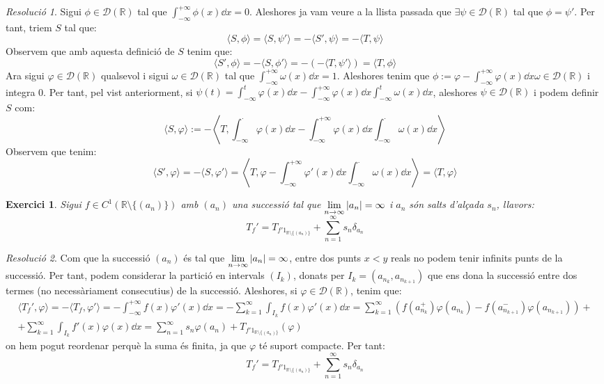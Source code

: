 \documentclass[10pt,a4paper]{article}
\newcommand{\RR}{\ensuremath{\mathbb{R}}} %
\newcommand{\vf}[1]{\boldsymbol{\mathrm{#1}}} %
\newtheorem{exercici}{Exercici}
\theoremstyle{definition}
\theoremstyle{remark}
\newtheorem*{res}{Resolució}
\begin{document}
\begin{res}
  Sigui $\phi\in\mathcal{D}(\RR)$ tal que $\int_{-\infty}^{+\infty}\phi(x) \dd{x}=0$. Aleshores ja vam veure a la llista passada que $\exists\psi\in \mathcal{D}(\RR)$ tal que $\phi=\psi'$. Per tant, triem $S$ tal que:
  $$
    \langle S,\phi\rangle = \langle S,\psi'\rangle = -\langle S',\psi\rangle = -\langle T,\psi\rangle
  $$
  Observem que amb aquesta definició de $S$ tenim que:
  $$
    \langle S',\phi\rangle = - \langle S, \phi'\rangle =-(-\langle T, \psi' \rangle) = \langle T, \phi \rangle
  $$
  Ara sigui $\varphi\in\mathcal{D}(\RR)$ qualsevol i sigui $\omega\in \mathcal{D}(\RR)$ tal que $\int_{-\infty}^{+\infty}\omega(x) \dd{x}=1$.
  Aleshores tenim que $\phi:=\varphi-\int_{-\infty}^{+\infty}\varphi(x) \dd{x}\omega\in\mathcal{D}(\RR)$ i integra 0. Per tant, pel vist anteriorment, si $\psi(t)=\int_{-\infty}^{t}\varphi(x)\dd{x}-\int_{-\infty}^{+\infty} \varphi(x)\dd{x}\int_{-\infty}^{t}\omega(x)\dd{x}$, aleshores $\psi\in\mathcal{D}(\RR)$ i podem definir $S$ com:
  $$
    \langle S,\varphi \rangle := -\left\langle T, \int_{-\infty}^{\cdot}\varphi(x)\dd{x}-\int_{-\infty}^{+\infty} \varphi(x)\dd{x}\int_{-\infty}^{\cdot}\omega(x)\dd{x} \right\rangle
  $$
  Observem que tenim:
  $$
    \langle S',\varphi \rangle = -\langle S,\varphi' \rangle = \left\langle T,\varphi-\int_{-\infty}^{+\infty} \varphi'(x)\dd{x}\int_{-\infty}^{\cdot}\omega(x)\dd{x} \right\rangle= \langle T,\varphi \rangle
  $$
\end{res}
\begin{exercici}
  Sigui $f\in C^1(\RR\setminus\{(a_n)\})$ amb $(a_n)$ una successió tal que $\displaystyle \lim_{n\to\infty}\abs{a_n}=\infty$ i $a_n$ són salts d'alçada $s_n$, llavors:
  $$
    T_f'=T_{f'\vf{1}_{\RR\setminus\{(a_n)\}}}+\sum_{n=1}^\infty s_n\delta_{a_n}
  $$
\end{exercici}
\begin{res}
  Com que la successió $(a_n)$ és tal que $\displaystyle \lim_{n\to\infty}\abs{a_n}=\infty$, entre dos punts $x<y$ reals no podem tenir infinits punts de la successió. Per tant, podem considerar la partició en intervals $(I_k)$, donats per $I_k=(a_{n_k},a_{n_{k+1}})$ que ens dona la successió entre dos termes (no necessàriament consecutius) de la successió. Aleshores, si $\varphi\in\mathcal{D}(\RR)$, tenim que:
  \begin{multline*}
    \langle T_f',\varphi\rangle = -\langle T_f,\varphi'\rangle=-\int_{-\infty}^{+\infty}f(x)\varphi'(x) \dd{x}=-\sum_{k=1}^\infty \int_{I_k} f(x) \varphi'(x)\dd{x} = \sum_{k=1}^\infty \left( f(a_{n_k}^+)\varphi(a_{n_k})-f(a_{n_{k+1}}^-)\varphi(a_{n_{k+1}})\right) +\\+ \sum_{k=1}^\infty \int_{I_k} f'(x) \varphi(x)\dd{x} =\sum_{n=1}^\infty s_n \varphi(a_n) + T_{f'\vf{1}_{\RR\setminus\{(a_n)\}}}(\varphi)
  \end{multline*}
  on hem pogut reordenar perquè la suma és finita, ja que $\varphi$ té suport compacte. Per tant:
  $$
    T_f'=T_{f'\vf{1}_{\RR\setminus\{(a_n)\}}}+\sum_{n=1}^\infty s_n\delta_{a_n}
  $$
\end{res}
\end{document}
